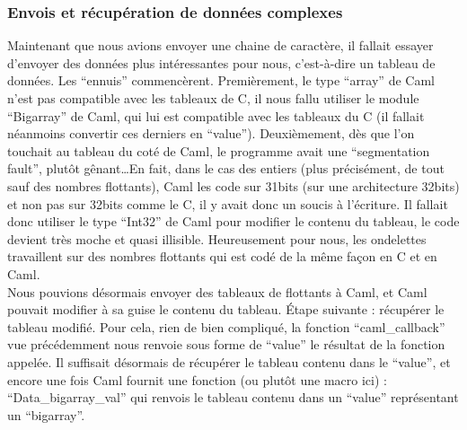 \documentclass[a4paper,12pt]{article}
\begin{document}
		\subsubsection{Envois et récupération de données complexes}
Maintenant que nous avions envoyer  une chaine de caractère,  il fallait
essayer d'envoyer des données plus intéressantes pour nous, c'est-à-dire
un tableau de  données.  Les ``ennuis'' commencèrent.  Premièrement,  le
type ``array'' de Caml n'est pas  compatible avec les tableaux de C,  il
nous  fallu  utiliser  le  module  ``Bigarray''  de  Caml,  qui  lui est
compatible avec  les tableaux du  C (il fallait  néanmoins convertir ces
derniers en ``value'').  Deuxièmement,  dès que l'on touchait au tableau
du coté de Caml,  le programme avait une ``segmentation fault'',  plutôt
gênant\ldots En fait, dans le cas des entiers (plus précisément, de tout
sauf  des  nombres  flottants),  Caml  les  code  sur  31bits  (sur  une
architecture 32bits) et non pas sur  32bits comme le C,  il y avait donc
un soucis à  l'écriture.  Il fallait donc utiliser le  type ``Int32'' de
Caml pour modifier le contenu du tableau,  le code devient très moche et
quasi illisible.  Heureusement pour nous, les ondelettes travaillent sur
des nombres flottants qui est codé de la même façon en C et en Caml.\\
Nous pouvions  désormais envoyer des  tableaux de flottants  à Caml,  et
Caml pouvait modifier à sa  guise le contenu du tableau.  Étape suivante
: récupérer le tableau modifié.  Pour cela,  rien de bien compliqué,  la
fonction ``caml\_callback'' vue précédemment  nous renvoie sous forme de
``value'' le résultat de la fonction appelée.  Il suffisait désormais de
récupérer le tableau contenu dans le ``value'',  et encore une fois Caml
fournit une fonction (ou plutôt une macro ici) : ``Data\_bigarray\_val''
qui  renvois  le  tableau  contenu  dans  un  ``value''  représentant un
``bigarray''.
\end{document}
